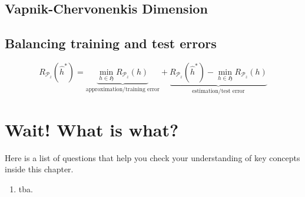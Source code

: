 \subsection{Vapnik-Chervonenkis Dimension}
\subsection{Balancing training and test errors}
$$
	R_{\mathcal{P}_z}(\hat{h}^*) = \underbrace{\min_{h \in \mathfrak{H}} R_{\mathcal{P}_z}(h)}_{\text{approximation/training error}} + \underbrace{R_{\mathcal{P}_z}(\hat{h}^*) - \min_{h \in \mathfrak{H}} R_{\mathcal{P}_z}(h)}_{\text{estimation/test error}} 
	$$

\section*{Wait! What is what?}
Here is a list of questions that help you check your understanding of key
concepts inside this chapter.

\begin{enumerate}
    \item tba. 
\end{enumerate}


